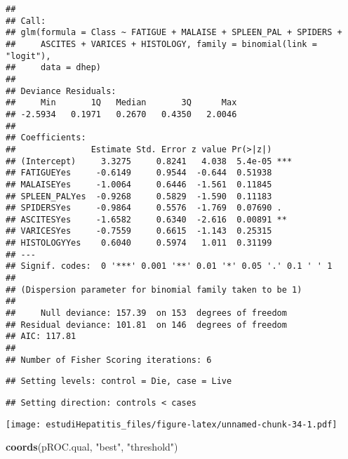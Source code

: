 \documentclass[]{article}
\newenvironment{Shaded}{\begin{snugshade}}{\end{snugshade}}
\newcommand{\DataTypeTok}[1]{\textcolor[rgb]{0.13,0.29,0.53}{#1}}
\newcommand{\KeywordTok}[1]{\textcolor[rgb]{0.13,0.29,0.53}{\textbf{#1}}}
\newcommand{\NormalTok}[1]{#1}
\newcommand{\OperatorTok}[1]{\textcolor[rgb]{0.81,0.36,0.00}{\textbf{#1}}}
\newcommand{\OtherTok}[1]{\textcolor[rgb]{0.56,0.35,0.01}{#1}}
\newcommand{\StringTok}[1]{\textcolor[rgb]{0.31,0.60,0.02}{#1}}
\begin{document}
\begin{verbatim}
## 
## Call:
## glm(formula = Class ~ FATIGUE + MALAISE + SPLEEN_PAL + SPIDERS + 
##     ASCITES + VARICES + HISTOLOGY, family = binomial(link = "logit"), 
##     data = dhep)
## 
## Deviance Residuals: 
##     Min       1Q   Median       3Q      Max  
## -2.5934   0.1971   0.2670   0.4350   2.0046  
## 
## Coefficients:
##               Estimate Std. Error z value Pr(>|z|)    
## (Intercept)     3.3275     0.8241   4.038  5.4e-05 ***
## FATIGUEYes     -0.6149     0.9544  -0.644  0.51938    
## MALAISEYes     -1.0064     0.6446  -1.561  0.11845    
## SPLEEN_PALYes  -0.9268     0.5829  -1.590  0.11183    
## SPIDERSYes     -0.9864     0.5576  -1.769  0.07690 .  
## ASCITESYes     -1.6582     0.6340  -2.616  0.00891 ** 
## VARICESYes     -0.7559     0.6615  -1.143  0.25315    
## HISTOLOGYYes    0.6040     0.5974   1.011  0.31199    
## ---
## Signif. codes:  0 '***' 0.001 '**' 0.01 '*' 0.05 '.' 0.1 ' ' 1
## 
## (Dispersion parameter for binomial family taken to be 1)
## 
##     Null deviance: 157.39  on 153  degrees of freedom
## Residual deviance: 101.81  on 146  degrees of freedom
## AIC: 117.81
## 
## Number of Fisher Scoring iterations: 6
\end{verbatim}

\begin{Shaded}
\end{Shaded}

\begin{verbatim}
## Setting levels: control = Die, case = Live
\end{verbatim}

\begin{verbatim}
## Setting direction: controls < cases
\end{verbatim}

\texttt{[image: estudiHepatitis\_files/figure-latex/unnamed-chunk-34-1.pdf]}

\begin{Shaded}
\begin{Highlighting}[]
\KeywordTok{coords}\NormalTok{(pROC.qual, }\StringTok{"best"}\NormalTok{, }\StringTok{"threshold"}\NormalTok{)}
\end{Highlighting}
\end{Shaded}
\end{document}
